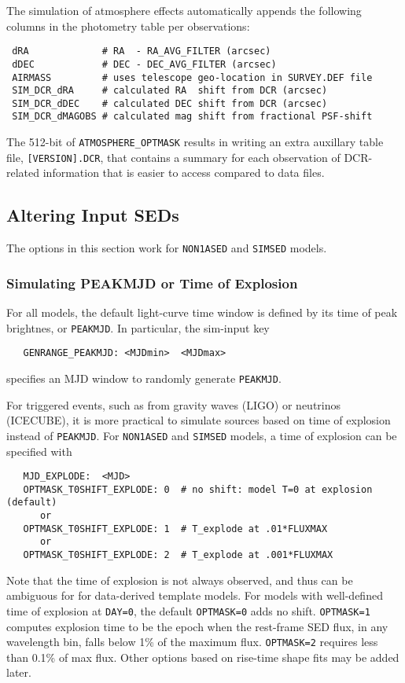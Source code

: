 \documentclass[12pt]{article}
\begin{document}
The simulation of atmosphere effects automatically appends the following
columns in the photometry table per observations:
\begin{verbatim}
 dRA             # RA  - RA_AVG_FILTER (arcsec)
 dDEC            # DEC - DEC_AVG_FILTER (arcsec)
 AIRMASS         # uses telescope geo-location in SURVEY.DEF file
 SIM_DCR_dRA     # calculated RA  shift from DCR (arcsec)
 SIM_DCR_dDEC    # calculated DEC shift from DCR (arcsec)
 SIM_DCR_dMAGOBS # calculated mag shift from fractional PSF-shift
\end{verbatim}
%

The 512-bit of {\tt ATMOSPHERE\_OPTMASK} results in writing
an extra auxillary table file, {\tt [VERSION].DCR}, that contains a
summary for each observation of DCR-related information that is easier 
to access compared to data files.

\clearpage
\subsection{Altering Input SEDs}
\label{subsec:Alter_SED}

The options in this section work for 
{\tt NON1ASED} and {\tt SIMSED} models.

\subsubsection{Simulating PEAKMJD or Time of Explosion}
\label{sss:tpeak_or_texplode}


For all models, the default light-curve time window is
defined by its time of peak brightnes, or {\tt PEAKMJD}.
In particular, the sim-input key 
\begin{verbatim}
   GENRANGE_PEAKMJD: <MJDmin>  <MJDmax>
\end{verbatim}
specifies an MJD window to randomly generate {\tt PEAKMJD}.

For triggered events, 
such as from gravity waves (LIGO) or neutrinos (ICECUBE),
it is more practical to simulate sources based on time
of explosion instead of {\tt PEAKMJD}. 
For {\tt NON1ASED} and {\tt SIMSED} models,
a time of explosion can be specified with
\begin{verbatim}
   MJD_EXPLODE:  <MJD>
   OPTMASK_T0SHIFT_EXPLODE: 0  # no shift: model T=0 at explosion (default)
      or
   OPTMASK_T0SHIFT_EXPLODE: 1  # T_explode at .01*FLUXMAX 
      or
   OPTMASK_T0SHIFT_EXPLODE: 2  # T_explode at .001*FLUXMAX
\end{verbatim}
%
Note that the time of explosion is not always observed, 
and thus can be ambiguous for for data-derived template models. 
For models with well-defined time of explosion at {\tt DAY=0},
the default {\tt OPTMASK=0} adds no shift.
{\tt OPTMASK=1} computes explosion time to be the epoch when 
the rest-frame SED flux, in any wavelength bin,  
falls below 1\% of the maximum flux.
{\tt OPTMASK=2} requires less than 0.1\% of max flux.
Other options based on rise-time shape fits may be added later.
\end{document}
